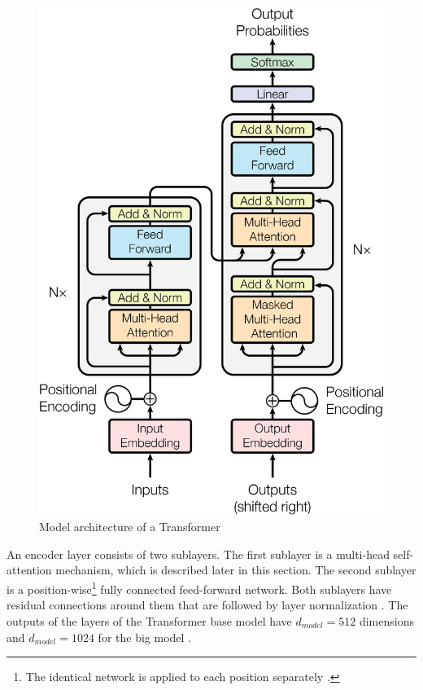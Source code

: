 \begin{figure}[h]
\centering
\includegraphics{figures/transformer-model}
\caption[Model architecture of a Transformer]{Model architecture of a Transformer \cite[p.~3]{1706.03762}}
\label{fig:transformer-model}
\end{figure}

An encoder layer consists of two sublayers.
The first sublayer is a multi-head self-attention mechanism, which is described later in this section.
The second sublayer is a position-wise\footnote{The identical network is applied to each position separately \cite[p.~5]{1706.03762}.} fully connected feed-forward network.
Both sublayers have residual connections \cite{1512.03385} around them that are followed by layer normalization \cite{1607.06450}.
The outputs of the layers of the Transformer base model have $d_{model}=512$ dimensions and $d_{model}=1024$ for the big model \cite[p.~9]{1706.03762}.


